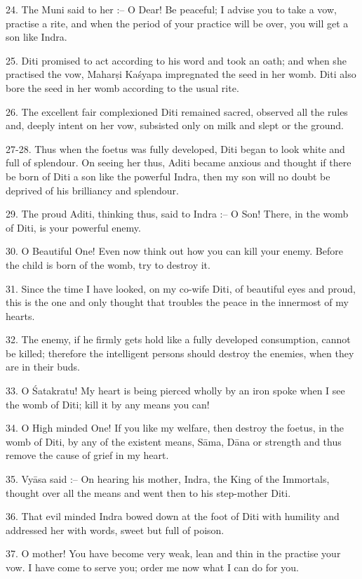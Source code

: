 24. The Muni said to her :-- O Dear! Be peaceful; I advise you to take a vow, practise a rite, and when the period of your practice will be over, you will get a son like Indra.

25. Diti promised to act according to his word and took an oath; and when she practised the vow, Mahar\d{s}i Ka\'syapa impregnated the seed in her womb. Diti also bore the seed in her womb according to the usual rite.

26. The excellent fair complexioned Diti remained sacred, observed all the rules and, deeply intent on her vow, subsisted only on milk and slept or the ground.

27-28. Thus when the foetus was fully developed, Diti began to look white and full of splendour. On seeing her thus, Aditi became anxious and thought if there be born of Diti a son like the powerful Indra, then my son will no doubt be deprived of his brilliancy and splendour.

29. The proud Aditi, thinking thus, said to Indra :-- O Son! There, in the womb of Diti, is your powerful enemy.

30. O Beautiful One! Even now think out how you can kill your enemy. Before the child is born of the womb, try to destroy
it.

31. Since the time I have looked, on my co-wife Diti, of beautiful eyes and proud, this is the one and only thought that troubles the peace in the innermost of my hearts.

32. The enemy, if he firmly gets hold like a fully developed consumption, cannot be killed; therefore the intelligent persons should destroy the enemies, when they are in their buds.

33. O \'Satakratu! My heart is being pierced wholly by an iron spoke when I see the womb of Diti; kill it by any means you can!

34. O High minded One! If you like my welfare, then destroy the foetus, in the womb of Diti, by any of the existent means, S\=ama, D\=ana or strength and thus remove the cause of grief in my heart.

35. Vy\=asa said :-- On hearing his mother, Indra, the King of the Immortals, thought over all the means and went then to his step-mother Diti.

36. That evil minded Indra bowed down at the foot of Diti with humility and addressed her with words, sweet but full of poison.

37. O mother! You have become very weak, lean and thin in the practise your vow. I have come to serve you; order me now what I can do for you.

